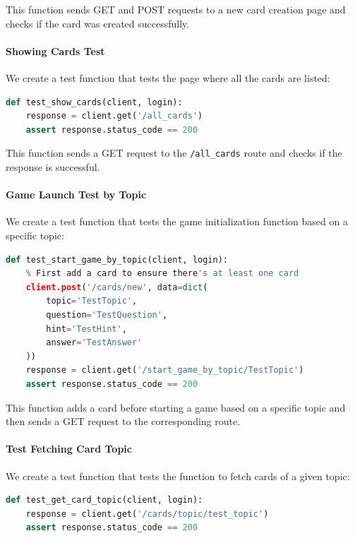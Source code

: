This function sends GET and POST requests to a new card creation page and checks if the card was created successfully.

\paragraph{Showing Cards Test}
We create a test function that tests the page where all the cards are listed:

\begin{lstlisting}[language=Python]
def test_show_cards(client, login):
    response = client.get('/all_cards')
    assert response.status_code == 200
\end{lstlisting}

This function sends a GET request to the \texttt{/all\_cards} route and checks if the response is successful.\newpage

\paragraph{Game Launch Test by Topic}
We create a test function that tests the game initialization function based on a specific topic:

\begin{lstlisting}[language=Python]
def test_start_game_by_topic(client, login):
    % First add a card to ensure there's at least one card
    client.post('/cards/new', data=dict(
        topic='TestTopic',
        question='TestQuestion',
        hint='TestHint',
        answer='TestAnswer'
    ))
    response = client.get('/start_game_by_topic/TestTopic')
    assert response.status_code == 200
\end{lstlisting}

This function adds a card before starting a game based on a specific topic and then sends a GET request to the corresponding route.



\paragraph{Test Fetching Card Topic}
We create a test function that tests the function to fetch cards of a given topic:

\begin{lstlisting}[language=Python]
def test_get_card_topic(client, login):
    response = client.get('/cards/topic/test_topic')
    assert response.status_code == 200

\end{lstlisting}

